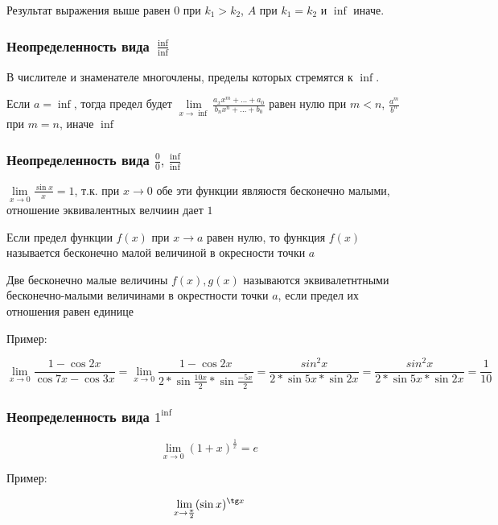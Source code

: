 \documentclass{article}
\begin{document}
Результат выражения выше равен $0$ при $k_1 > k_2$, $A$ при $k_1 = k_2$ и $\inf$ иначе.  

\subsubsection{Неопределенность вида $\frac{\inf}{\inf}$}

В числителе и знаменателе многочлены, пределы которых стремятся к $\inf$.

Если $a = \inf$, тогда предел будет $\lim\limits_{x \to \inf} \frac{a_{x}x^{m} + ... + a_0}{b_{n}x^{n} + ... + b_0}$ равен нулю при $m < n$, $\frac{a^m}{b^n}$при $m = n$, иначе $\inf$

\subsubsection{Неопределенность вида $\frac{0}{0}, \frac{\inf}{\inf}$}

$\lim\limits_{x \to 0} \frac{\sin{x}}{x} = 1$, т.к. при $x \to 0$ обе эти функции являюстя бесконечно малыми, отношение эквивалентных велчиин дает $1$

Если предел функции $f(x)$ при $x \to a$ равен нулю, то функция $f(x)$ называется бесконечно малой величиной в окресности точки $a$

Две бесконечно малые величины $f(x), g(x)$ называются эквивалетнтными бесконечно-малыми величинами в окрестности точки $a$, если предел их отношения равен единице

Пример:

$$
\lim\limits_{x \to 0} \frac{1 - \cos{2x}}{\cos 7x - \cos 3x} = \lim\limits_{x \to 0} \frac{1 - \cos{2x}}{2 * \sin{\frac{10x}{2}} * \sin{\frac{-5x}{2}}} = \frac{sin^2{x}}{2 * \sin{5x} * \sin{2x}} = \frac{sin^2{x}}{2 * \sin{5x} * \sin{2x}} = \frac{1}{10}
$$

\subsubsection{Неопределенность вида $1^{\inf}$}

$$\lim\limits_{x \to 0} (1 + x)^{\frac{1}{x}} = e$$

Пример:

$$
\lim\limits_{x \to \frac{\pi}{2}} (\sin x)^{\tg x}
$$
\end{document}
